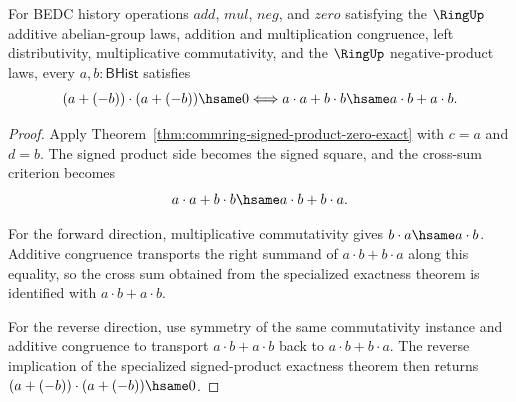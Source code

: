 \begin{theorem}
\label{thm:commring-signed-square-zero-exact}
For BEDC history operations $add$, $mul$, $neg$, and $zero$ satisfying the
$\RingUp$ additive abelian-group laws, addition and multiplication
congruence, left distributivity, multiplicative commutativity, and the
$\RingUp$ negative-product laws, every $a,b : \mathsf{BHist}$ satisfies
$$
(a+(-b))\cdot(a+(-b))\hsame0
\Longleftrightarrow
a\cdot a+b\cdot b\hsame a\cdot b+a\cdot b .
$$
\end{theorem}
\begin{proof}
Apply Theorem~\ref{thm:commring-signed-product-zero-exact} with $c=a$ and
$d=b$. The signed product side becomes the signed square, and the cross-sum
criterion becomes
$$
a\cdot a+b\cdot b\hsame a\cdot b+b\cdot a .
$$

For the forward direction, multiplicative commutativity gives
$b\cdot a\hsame a\cdot b$. Additive congruence transports the right summand
of $a\cdot b+b\cdot a$ along this equality, so the cross sum obtained from
the specialized exactness theorem is identified with
$a\cdot b+a\cdot b$.

For the reverse direction, use symmetry of the same commutativity instance
and additive congruence to transport $a\cdot b+a\cdot b$ back to
$a\cdot b+b\cdot a$. The reverse implication of the specialized
signed-product exactness theorem then returns
$(a+(-b))\cdot(a+(-b))\hsame0$.
\end{proof}

